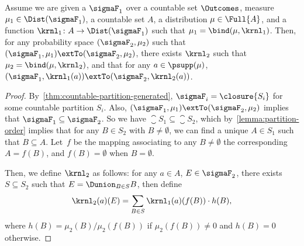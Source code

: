 \documentclass[acmsmall,nonacm,screen,appendix]{acmart}
\begin{document}
\begin{lemma}
 \label{lemma:bind-extend}
 Assume we are given a \salgebra{} $\sigmaF_1$
 over a countable set $\Outcomes$,
 measure $\mu_1 \in \Dist(\sigmaF_1)$,
 a countable set $A$,
 a distribution $\mu \in \Full{A}$,
 and a function $\krnl_1 \colon A \to \Dist(\sigmaF_1)$
 such that $\mu_1 = \bind(\mu, \krnl_1)$.
 Then, for any probability space $(\sigmaF_2, \mu_2)$ such that
 $(\sigmaF_1, \mu_1) \extTo (\sigmaF_2, \mu_2)$,
 there exists $\krnl_2$ such that $\mu_2 = \bind(\mu, \krnl_2)$,
 and that for any $a \in \psupp(\mu)$,
 $(\sigmaF_1, \krnl_1(a)) \extTo (\sigmaF_2, \krnl_2(a))$.
\end{lemma}

\begin{proof}
  By~\cref{thm:countable-partition-generated},
  $\sigmaF_i = \closure{S_i}$ for some countable partition $S_i$.
  Also, $(\sigmaF_1, \mu_1) \extTo (\sigmaF_2, \mu_2)$ implies that
  $\sigmaF_1 \subseteq \sigmaF_2$.
  So we have $\closure{S_1} \subseteq \closure{S_2}$,
  which by~\cref{lemma:partition-order} implies that
  for any $B \in S_2$ with $B \ne \emptyset$,
  we can find a unique $A \in S_1$ such that $B \subseteq A$.
  Let~$f$ be the mapping associating to any $B\ne \emptyset$
  the corresponding $A = f(B)$, and $f(B)=\emptyset$ when $B=\emptyset$.

  Then, we define $\krnl_2$ as follows:
  for any $a \in A$, $E \in \sigmaF_2$,
  there exists $S \subseteq S_2$ such that
  $E = \Dunion_{B \in S} B$,
  then define
\begin{align*}
   \krnl_2(a)(E) = \sum_{B \in S} \krnl_1(a)(f(B)) \cdot h(B),
  \end{align*}
  where
  $h(B) = \mu_2(B) / \mu_2(f(B))$ if $ \mu_2(f(B)) \neq 0$
  and $h(B) = 0$ otherwise.


\end{proof}
\end{document}
